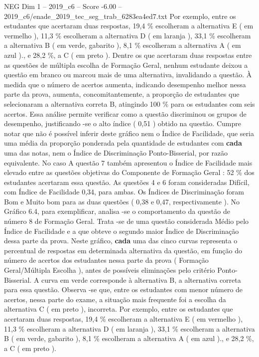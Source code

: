 \begin{textsample}{NEG Dim 1 – 2019\_c6 – Score -6.00 – 2019\_c6/enade\_2019\_tec\_seg\_trab\_6283ea4ed7.txt}
Por exemplo, entre os estudantes que acertaram duas respostas, 19,4 \% escolheram a alternativa E ( em vermelho ), 11,3 \% escolheram a alternativa D ( em laranja ), 33,1 \% escolheram a alternativa B ( em verde, gabarito ), 8,1 \% escolheram a alternativa A ( em azul )., e 28,2 \%, a C ( em preto ).
Dentre os que acertaram duas respostas entre as questões de múltipla escolha de Formação Geral, nenhum estudante deixou a questão em branco ou marcou mais de uma alternativa, invalidando a questão.
À medida que o número de acertos aumenta, indicando desempenho melhor nessa parte da prova, aumenta, concomitantemente, a proporção de estudantes que selecionaram a alternativa correta B, atingindo 100 \% para os estudantes com seis acertos.
Essa análise permite verificar como a questão discriminou os grupos de desempenho, justificando -se o alto índice ( 0,51 ) obtido na questão.
Cumpre notar que não é possível inferir deste gráfico nem o Índice de Facilidade, que seria uma média da proporção ponderada pela quantidade de estudantes com \textbf{cada} uma das notas, nem o Índice de Discriminação Ponto-Bisserial, por razão equivalente.
No caso A questão 7 também apresentou o Índice de Facilidade mais elevado entre as questões objetivas do Componente de Formação Geral : 52 \% dos estudantes acertaram essa questão.
As questões 4 e 6 foram consideradas Difícil, com Índice de Facilidade 0,34, para ambas.
Os Índices de Discriminação foram Bom e Muito bom para as duas questões ( 0,38 e 0,47, respectivamente ).
No Gráfico 6.4, para exemplificar, analisa -se o comportamento da questão de número 8 de Formação Geral.
Trata -se de uma questão considerada Médio pelo Índice de Facilidade e a que obteve o segundo maior Índice de Discriminação dessa parte da prova.
Neste gráfico, \textbf{cada} uma das cinco curvas representa o percentual de respostas em determinada alternativa da questão, em função do número de acertos dos estudantes nessa parte da prova ( Formação Geral/Múltipla Escolha ), antes de possíveis eliminações pelo critério Ponto-Bisserial.
A curva em verde corresponde à alternativa B, a alternativa correta para essa questão.
Observa -se que, entre os estudantes com menor número de acertos, nessa parte do exame, a situação mais frequente foi a escolha da alternativa C ( em preto ), incorreta.
Por exemplo, entre os estudantes que acertaram duas respostas, 19,4 \% escolheram a alternativa E ( em vermelho ), 11,3 \% escolheram a alternativa D ( em laranja ), 33,1 \% escolheram a alternativa B ( em verde, gabarito ), 8,1 \% escolheram a alternativa A ( em azul )., e 28,2 \%, a C ( em preto ).

\end{textsample}
